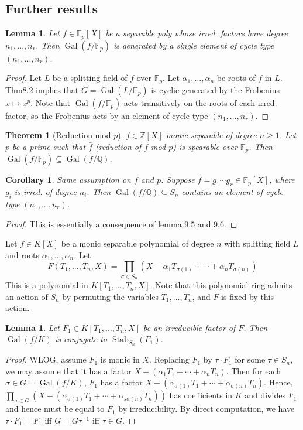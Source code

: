 \documentclass{article}
\theoremstyle{definition}
\theoremstyle{remark}
\theoremstyle{plain}
\newtheorem{lem}[defn]{Lemma}
\newtheorem{thm}[defn]{Theorem}
\newtheorem{crly}[defn]{Corollary}
\newcommand{\ZZ}{\mathbb{Z}}
\newcommand{\QQ}{\mathbb{Q}}
\newcommand{\FF}{\mathbb{F}}
\newcommand{\Gal}{\operatorname{Gal}}
\begin{document}
\subsection{Further results}
\begin{lem}
    Let $f\in\FF_p[X]$ be a separable poly whose irred. factors have degree $n_1,...,n_r$. Then $\Gal(f/\FF_p)$ is generated by a single element of cycle type $(n_1,...,n_r)$.
\end{lem}
\begin{proof}
    Let $L$ be a splitting field of $f$ over $\FF_p$. Let $\alpha_1,...,\alpha_n$ be roots of $f$ in $L$. Thm8.2 implies that $G=\Gal(L/\FF_p)$ is cyclic generated by the Frobenius $x\mapsto x^p$. Note that $\Gal(f/\FF_p)$ acts transitively on the roots of each irred. factor, so the Frobenius acts by an element of cycle type $(n_1,...,n_r)$.
\end{proof}
\begin{thm}[Reduction mod $p$]
    $f\in \ZZ[X]$ monic separable of degree $n\ge 1$. Let $p$ be a prime such that $\bar f$ (reduction of $f$ mod $p$) is spearable over $\FF_p$. Then $\Gal(\bar f/\FF_p)\subseteq\Gal(f/\QQ)$.
\end{thm}
\begin{crly}
    Same assumption on $f$ and $p$. Suppose $\bar f=g_1\cdots g_r\in \FF_p[X]$, where $g_i$ is irred. of degree $n_i$. Then $\Gal(f/\QQ)\subseteq S_n$ contains an element of cycle type $(n_1,...,n_r)$.
\end{crly}
\begin{proof}
    This is essentially a consequence of lemma 9.5 and 9.6.
\end{proof}
Let $f\in K[X]$ be a monic separable polynomial of degree $n$ with splitting field $L$ and roots $\alpha_1,...,\alpha_n$. Let $$F(T_1,...,T_n,X)=\prod_{\sigma\in S_n}(X-\alpha_1T_{\sigma(1)}+\cdots+\alpha_nT_{\sigma(n)})$$ This is a polynomial in $K[T_1,...,T_n,X]$. Note that this polynomial ring admits an action of $S_n$ by permuting the variables $T_1,...,T_n$, and $F$ is fixed by this action.
\begin{lem}
    Let $F_1\in K[T_1,...,T_n,X]$ be an irreducible factor of $F$. Then $\Gal(f/K)$ is conjugate to $\operatorname{Stab}_{S_n}(F_1)$.
\end{lem}
\begin{proof}
    WLOG, assume $F_1$ is monic in $X$. Replacing $F_1$ by $\tau\cdot F_1$ for some $\tau\in S_n$, we may assume that it has a factor $X-(\alpha_1T_1+\cdots+\alpha_nT_n)$. Then for each $\sigma\in G=\Gal(f/K)$, $F_1$ has a factor $X-(\alpha_{\sigma(1)}T_1+\cdots+\alpha_{\sigma(n)}T_n)$. Hence, $\prod_{\sigma\in G}(X-(\alpha_{\sigma(1)}T_1+\cdots+\alpha_{s\sigma(n)}T_n))$ has coefficients in $K$ and divides $F_1$ and hence must be equal to $F_1$ by irreducibility. By direct computation, we have $\tau\cdot F_1=F_1$ iff $G=G\tau^{-1}$ iff $\tau\in G$.
\end{proof}
\end{document}
